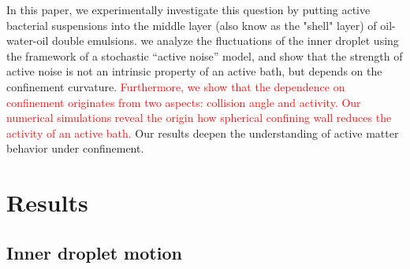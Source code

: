 \documentclass[%
superscriptaddress,
 amsmath,amssymb,
 aps,prl,
]{revtex4-2}
\begin{document}
In this paper, we experimentally investigate this question by putting active bacterial suspensions into the middle layer (also know as the "shell" layer) of oil-water-oil double emulsions. we analyze the fluctuations of the inner droplet using the framework of a stochastic ``active noise'' model, and show that the strength of active noise is not an intrinsic property of an active bath, but depends on the confinement curvature. \textcolor{red}{Furthermore, we show that the dependence on confinement originates from two aspects: collision angle and activity. Our numerical simulations reveal the origin how spherical confining wall reduces the activity of an active bath.} Our results deepen the understanding of active matter behavior under confinement.

\section{Results}

\subsection{Inner droplet motion}

\end{document}
